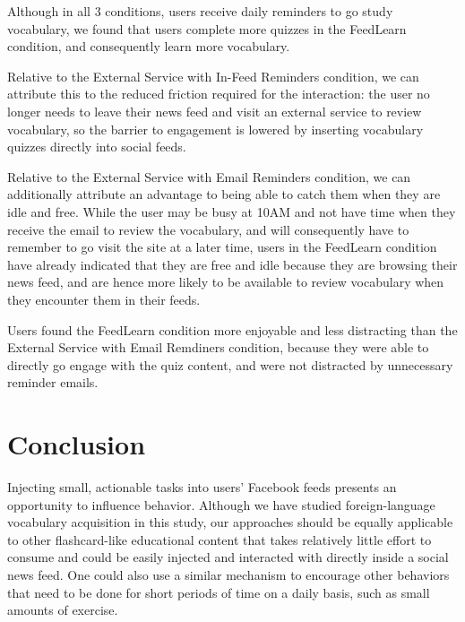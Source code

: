 \documentclass{chi-ext}
\begin{document}
Although in all 3 conditions, users receive daily reminders to go study vocabulary, we found that users complete more quizzes in the FeedLearn condition, and consequently learn more vocabulary.

Relative to the External Service with In-Feed Reminders condition, we can attribute this to the reduced friction required for the interaction: the user no longer needs to leave their news feed and visit an external service to review vocabulary, so the barrier to engagement is lowered by inserting vocabulary quizzes directly into social feeds.

Relative to the External Service with Email Reminders condition, we can additionally attribute an advantage to being able to catch them when they are idle and free. While the user may be busy at 10AM and not have time when they receive the email to review the vocabulary, and will consequently have to remember to go visit the site at a later time, users in the FeedLearn condition have already indicated that they are free and idle because they are browsing their news feed, and are hence more likely to be available to review vocabulary when they encounter them in their feeds.

Users found the FeedLearn condition more enjoyable and less distracting than the External Service with Email Remdiners condition, because they were able to directly go engage with the quiz content, and were not distracted by unnecessary reminder emails.

\section{Conclusion}

Injecting small, actionable tasks into users' Facebook feeds presents an opportunity to influence behavior. Although we have studied foreign-language vocabulary acquisition in this study, our approaches should be equally applicable to other flashcard-like educational content that takes relatively little effort to consume and could be easily injected and interacted with directly inside a social news feed. One could also use a similar mechanism to encourage other behaviors that need to be done for short periods of time on a daily basis, such as small amounts of exercise.



\end{document}
